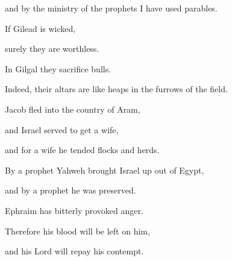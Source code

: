{\par }{\QB and by the ministry of the prophets I have used parables.
\par }{\Q {}If Gilead is wicked,
\par }{\QB surely they are worthless.
\par }{\Q In Gilgal they sacrifice bulls.
\par }{\QB Indeed, their altars are like heaps in the furrows of the field.
\par }{\Q {}Jacob fled into the country of Aram,
\par }{\QB and Israel served to get a wife,
\par }{\QB and for a wife he tended flocks and herds.
\par }{\Q {}By a prophet Yahweh brought Israel up out of Egypt,
\par }{\QB and by a prophet he was preserved.
\par }{\Q {}Ephraim has bitterly provoked anger.
\par }{\QB Therefore his blood will be left on him,
\par }{\QB and his Lord will repay his contempt.

}

